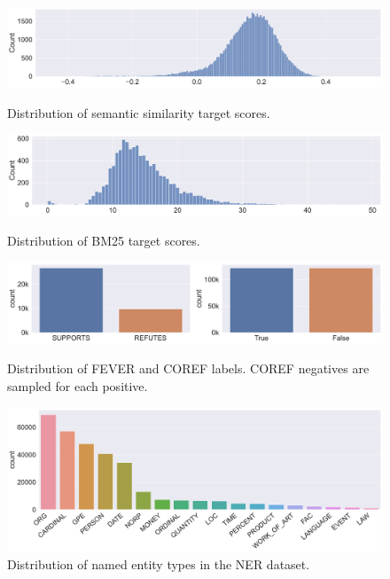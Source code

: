 \begin{figure}
    \centering
    \includegraphics[width=\textwidth]{gfx/probing/labels/sem}
    \caption{Distribution of semantic similarity target scores.}

    \bigskip

    \centering
    \includegraphics[width=\textwidth]{gfx/probing/labels/bm25}
    \caption{Distribution of BM25 target scores.}

    \bigskip

    \centering
    \includegraphics[width=\textwidth]{gfx/probing/labels/fever_coref}
    \caption{Distribution of FEVER and COREF labels. COREF negatives are sampled for each positive.}

    \bigskip

    \centering
    \includegraphics[width=\textwidth]{gfx/probing/labels/ner}
    \caption{Distribution of named entity types in the NER dataset.}

\end{figure}
